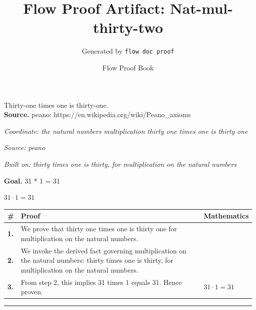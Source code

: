 \documentclass[11pt]{article}
\title{Flow Proof Artifact: Nat-mul-thirty-two}
\author{Generated by \texttt{flow doc proof}}
\date{Flow Proof Book}
\theoremstyle{definition}
\begin{document}
\maketitle
Thirty-one times one is thirty-one.\\[0.5em]
\textbf{Source.} peano: https://en.wikipedia.org/wiki/Peano\_axioms\\[0.5em]
\bigskip
{}\par
\smallskip\noindent\textit{Coordinate: the natural numbers \cdot multiplication \cdot thirty one times one is thirty one}\par
\smallskip\noindent\textit{Source: peano}\par
\smallskip\noindent\textit{Built on: thirty times one is thirty, for multiplication on the natural numbers}\par
\medskip
\noindent\textbf{Goal.} 31 * 1 = 31\par
\noindent$\displaystyle 31 \cdot 1 = 31$\par
\medskip
\noindent
\begin{tabular}{@{} >{\raggedright\arraybackslash}p{} >{\raggedright\arraybackslash}p{} >{\raggedleft\arraybackslash}p{} @{}}
\textbf{\#} & \textbf{Proof} & \textbf{Mathematics} \\
\midrule
\textbf{1.} & We prove that thirty one times one is thirty one for multiplication on the natural numbers. & \\[0.45em]
\textbf{2.} & We invoke the derived fact governing multiplication on the natural numbers: thirty times one is thirty, for multiplication on the natural numbers. & \\[0.45em]
\textbf{3.} & From step 2, this implies 31 times 1 equals 31. Hence proven. & $\displaystyle 31 \cdot 1 = 31$ \\[0.45em]
\bottomrule
\end{tabular}
\label{thm:Nat-multiplication-thirty_one_times_one_is_thirty_one}
\par\medskip\hrule
\end{document}
